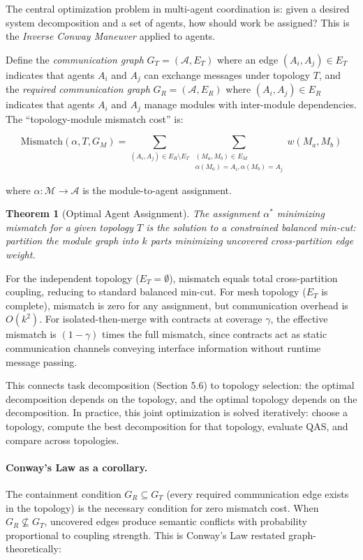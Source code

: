 \documentclass[11pt, a4paper]{googledeepmind}
\newtheorem{theorem}{Theorem}[section]
\begin{document}
The central optimization problem in multi-agent coordination is: given a desired system decomposition and a set of agents, how should work be assigned? This is the \emph{Inverse Conway Maneuver} applied to agents.

Define the \emph{communication graph} $G_T = (\mathcal{A}, E_T)$ where an edge $(A_i, A_j) \in E_T$ indicates that agents $A_i$ and $A_j$ can exchange messages under topology $T$, and the \emph{required communication graph} $G_R = (\mathcal{A}, E_R)$ where $(A_i, A_j) \in E_R$ indicates that agents $A_i$ and $A_j$ manage modules with inter-module dependencies. The ``topology-module mismatch cost'' is:

\begin{equation}
    \mathrm{Mismatch}(\alpha, T, G_M) = \sum_{(A_i, A_j) \in E_R \setminus E_T} \sum_{\substack{(M_a, M_b) \in E_M \\ \alpha(M_a)=A_i, \alpha(M_b)=A_j}} w(M_a, M_b)
\end{equation}

where $\alpha: \mathcal{M} \to \mathcal{A}$ is the module-to-agent assignment.

\begin{theorem}[Optimal Agent Assignment]
\label{thm:inverse-conway}
The assignment $\alpha^*$ minimizing mismatch for a given topology $T$ is the solution to a constrained balanced min-cut: partition the module graph into $k$ parts minimizing uncovered cross-partition edge weight.
\end{theorem}

For the independent topology ($E_T = \emptyset$), mismatch equals total cross-partition coupling, reducing to standard balanced min-cut. For mesh topology ($E_T$ is complete), mismatch is zero for any assignment, but communication overhead is $O(k^2)$. For isolated-then-merge with contracts at coverage $\gamma$, the effective mismatch is $(1-\gamma)$ times the full mismatch, since contracts act as static communication channels conveying interface information without runtime message passing.

This connects task decomposition (Section 5.6) to topology selection: the optimal decomposition depends on the topology, and the optimal topology depends on the decomposition. In practice, this joint optimization is solved iteratively: choose a topology, compute the best decomposition for that topology, evaluate QAS, and compare across topologies.

\paragraph{Conway's Law as a corollary.} The containment condition $G_R \subseteq G_T$ (every required communication edge exists in the topology) is the necessary condition for zero mismatch cost. When $G_R \not\subseteq G_T$, uncovered edges produce semantic conflicts with probability proportional to coupling strength. This is Conway's Law \citep{conway1968} restated graph-theoretically:
\end{document}
